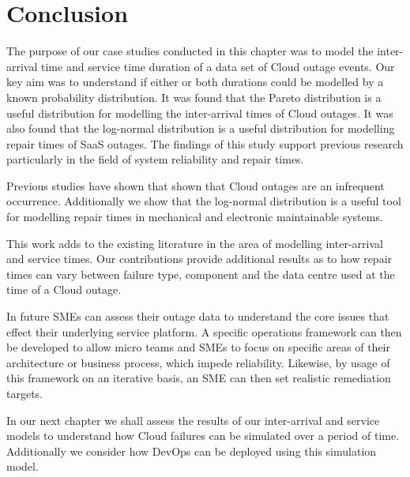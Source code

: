 
\section{Conclusion}
The purpose of our case studies conducted in this chapter was to model the inter-arrival time and service time duration of a data set of Cloud outage events. Our key aim was to understand if either or both durations could be modelled by a known probability distribution. It was found that the Pareto distribution is a useful distribution for modelling the inter-arrival times of Cloud outages. It was also found that the log-normal distribution is a useful distribution for modelling repair times of SaaS outages. The findings of this study support previous research particularly in the field of system reliability and repair times. \par

Previous studies have shown that shown that Cloud outages are an infrequent occurrence. Additionally we show that the log-normal distribution is a useful tool for modelling repair times in mechanical and electronic maintainable systems. \par

This work adds to the existing literature in the area of modelling inter-arrival and service times. Our contributions provide additional results as to how repair times can vary between failure type, component and the data centre used at the time of a Cloud outage. \par

In future SMEs can assess their outage data to understand the core issues that effect their underlying service platform. A specific operations framework can then be developed to allow micro teams and SMEs to focus on specific areas of their architecture or business process, which impede reliability. Likewise, by usage of this framework on an iterative basis, an SME can then set realistic remediation targets. \par

In our next chapter we shall assess the results of our inter-arrival and service models to understand how Cloud failures can be simulated over a period of time. Additionally we consider how DevOps can be deployed using this simulation model. \par


